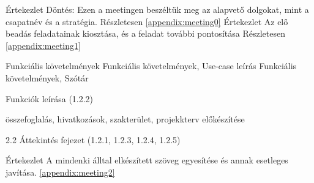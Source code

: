\documentclass[../../projlab]{subfiles}
\begin{document}
\begin{naplo}
	{ Értekezlet
		\newline Döntés: Ezen a meetingen beszéltük meg az alapvető dolgokat, mint a csapatnév és a stratégia.
		Részletesen \ref{appendix:meeting0}
	}
	{ Értekezlet
		\newline Az elő beadás feladatainak kiosztása, és a feladat további pontosítása
		Részletesen \ref{appendix:meeting1}
	}


	{ 
		Funkciális követelmények
	}
	{ 
		Funkciális követelmények, Use-case leírás
	}
	{ 
		Funkciális követelmények, Szótár
	}



	{ 
		Funkciók leírása (1.2.2)
	}

	{ 
		összefoglalás, hivatkozások, szakterület, projekkterv előkészítése
	}

	{ 
		2.2 Áttekintés fejezet
		(1.2.1, 1.2.3, 1.2.4, 1.2.5)
	}

	{ 
		Értekezlet
		\newline A mindenki álltal elkészített szöveg egyesítése és annak esetleges javítása.
		\ref{appendix:meeting2}
	}

\end{naplo}

\begin{toappendix}


\end{toappendix}
\end{document}
